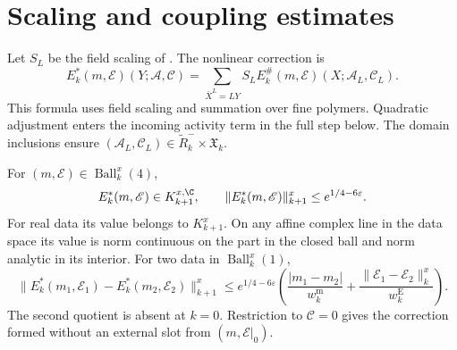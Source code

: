 \section{Scaling and coupling estimates}
\label{subsec:rgnl-scaled-correction}

Let $S_L$ be the field scaling of
. The nonlinear correction is
\begin{equation}\label{eq:rgnl-scaled-correction}
 E_k^*(m,\mathscr E)(Y;\mathscr A,\mathscr C)
  =\sum_{\bar X^L=LY}S_L
        E_k^\#(m,\mathscr E)(X;\mathscr A_L,\mathscr C_L).
\end{equation}
This formula uses field scaling and summation over fine
polymers. Quadratic adjustment enters the incoming
activity term in the full step below.
The domain inclusions
 ensure
$(\mathscr A_L,\mathscr C_L)
\in\widetilde R_k^-\times\mathfrak X_k$.

\begin{proposition}\label{prop:rgnl-scaled-correction}
For $(m,\mathscr E)\in\operatorname{Ball}_k^x(4)$,
\[
 E_k^*(m,\mathscr E)\in K_{k+1}^{x,\C},\qquad
                  \|E_k^*(m,\mathscr E)\|_{k+1}^x
                                      \le e^{1/4-6\varepsilon}.
\]
For real data its value belongs to $K_{k+1}^x$.
On any affine complex line in the data space its value
is norm continuous on the part in the closed ball and
norm analytic in its interior.
For two data in $\operatorname{Ball}_k^x(1)$,
\begin{equation}\label{eq:rgnl-coupling-Lipschitz}
 \|E_k^*(m_1,\mathscr E_1)-E_k^*(m_2,\mathscr E_2)\|_{k+1}^x
 \le e^{1/4-6\varepsilon}
       \left(\frac{|m_1-m_2|}{w_k^{\mathrm m}}
              +\frac{\|\mathscr E_1-\mathscr E_2\|_k^x}
                                                    {w_k^{\mathrm E}}\right).
\end{equation}
The second quotient is absent at $k=0$.
Restriction to $\mathscr C=0$ gives the correction formed
without an external slot from $(m,\mathscr E|_0)$.
\end{proposition}

